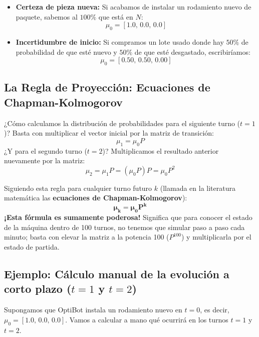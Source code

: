 \begin{itemize}
  \item \textbf{Certeza de pieza nueva:} Si acabamos de instalar un rodamiento nuevo de paquete, sabemos al $100\%$ que está en $N$:
  \[
    \mu_0 = [1.0, \, 0.0, \, 0.0]
  \]
  \item \textbf{Incertidumbre de inicio:} Si compramos un lote usado donde hay $50\%$ de probabilidad de que esté nuevo y $50\%$ de que esté desgastado, escribiríamos:
  \[
    \mu_0 = [0.50, \, 0.50, \, 0.00]
  \]
\end{itemize}

\subsection*{La Regla de Proyección: Ecuaciones de Chapman-Kolmogorov}
¿Cómo calculamos la distribución de probabilidades para el siguiente turno ($t=1$)? Basta con multiplicar el vector inicial por la matriz de transición:
\begin{equation}
  \mu_1 = \mu_0 P
\end{equation}
¿Y para el segundo turno ($t=2$)? Multiplicamos el resultado anterior nuevamente por la matriz:
\begin{equation}
  \mu_2 = \mu_1 P = (\mu_0 P) P = \mu_0 P^2
\end{equation}

Siguiendo esta regla para cualquier turno futuro $k$ (llamada en la literatura matemática las \textbf{ecuaciones de Chapman-Kolmogorov}):
\begin{equation}
  \mathbf{\mu_k = \mu_0 P^k}
\end{equation}
\textbf{¡Esta fórmula es sumamente poderosa!} Significa que para conocer el estado de la máquina dentro de 100 turnos, no tenemos que simular paso a paso cada minuto; basta con elevar la matriz a la potencia 100 ($P^{100}$) y multiplicarla por el estado de partida.

\subsection*{Ejemplo: Cálculo manual de la evolución a corto plazo ($t=1$ y $t=2$)}
Supongamos que OptiBot instala un rodamiento nuevo en $t=0$, es decir, $\mu_0 = [1.0, \, 0.0, \, 0.0]$. Vamos a calcular a mano qué ocurrirá en los turnos $t=1$ y $t=2$.

